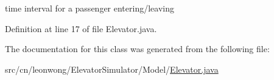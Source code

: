 time interval for a passenger entering/leaving 



Definition at line 17 of file Elevator.\+java.



The documentation for this class was generated from the following file\+:\begin{DoxyCompactItemize}
\item 
src/cn/leonwong/\+Elevator\+Simulator/\+Model/\hyperlink{_elevator_8java}{Elevator.\+java}\end{DoxyCompactItemize}
